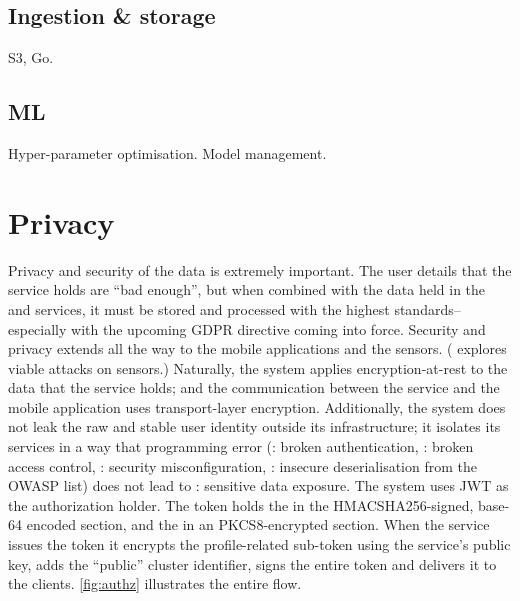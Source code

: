 \subsection{Ingestion \& storage}
S3, Go.

\subsection{ML} 
Hyper-parameter optimisation. Model management.

\section{Privacy}
Privacy and security of the data is extremely important. The user details that the  service holds are ``bad enough'', but when combined with the data held in the  and  services, it must be stored and processed with the highest standards--especially with the upcoming GDPR\cite{gdpr} directive coming into force. Security and privacy extends all the way to the mobile applications and the sensors. (\cite{Fu:AuI932n8} explores viable attacks on sensors.) Naturally, the system applies encryption-at-rest to the data that the  service holds; and the communication between the  service and the mobile application uses transport-layer encryption. Additionally, the system does not leak the raw and stable user identity outside its infrastructure; it isolates its services in a way that programming error (: broken authentication, : broken access control, : security misconfiguration, : insecure deserialisation from the OWASP\cite{owasp} list) does not lead to : sensitive data exposure. The system uses JWT\cite{jwt} as the authorization holder. The token holds the  in the HMACSHA256-signed, base-64 encoded section, and the  in an PKCS8-encrypted section. When the  service issues the token it encrypts the profile-related sub-token using the  service's public key, adds the ``public'' cluster identifier, signs the entire token and delivers it to the clients. \autoref{fig:authz} illustrates the entire flow.


